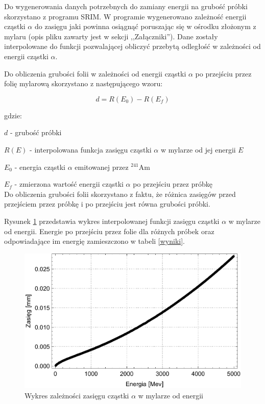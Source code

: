\documentclass[12pt,a4paper]{article}
\newcommand{\Ameryk}{${}^{241}_{}{}$Am }
\begin{document}
Do wygenerowania danych potrzebnych do zamiany energii na grubość próbki skorzystano z programu SRIM. W programie wygenerowano zależność energii cząstki $\alpha$ do zasięgu jaki powinna osiągnąć poruszając się w ośrodku złożonym z mylaru (opis pliku zawarty jest w sekcji ,,Załączniki''). Dane zostały interpolowane  do funkcji pozwalającej obliczyć przebytą odległość w zależności od energii cząstki $\alpha$. 

Do obliczenia grubości folii w zależności od energii cząstki $\alpha$  po przejściu przez folię mylarową skorzystano z następującego wzoru:    

\[d = R(E_0)-R(E_f)\]

gdzie:

$d$ - grubość próbki

$R(E)$ - interpolowana funkcja zasięgu cząstki $\alpha$ w mylarze od jej  energii $E$

$E_0$ - energia cząstki $\alpha$ emitowanej przez \Ameryk

$E_f$ - zmierzona wartość energii cząstki $\alpha$ po przejściu przez próbkę
\\


Do obliczenia grubości folii skorzystano z faktu, że różnica zasięgów przed przejściem przez próbkę i po przejściu jest równa grubości próbki.


Rysunek \ref{energia_zasieg} przedstawia wykres interpolowanej funkcji zasięgu cząstki $\alpha$ w mylarze od energii. Energie po przejściu przez folie dla różnych próbek oraz odpowiadające im energię zamieszczono w tabeli \ref{wyniki}. 

\begin{figure}[H]
\centering
\includegraphics[scale=0.9]{energia_zasieg.pdf}
\caption{Wykres zależności zasięgu cząstki $\alpha$ w mylarze od energii}
\label{energia_zasieg}
\end{figure}
\end{document}
